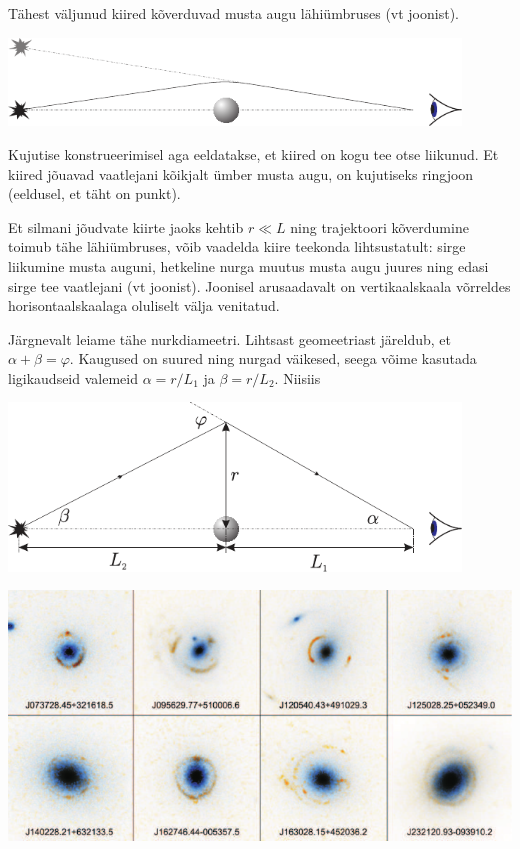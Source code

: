 \documentclass[11pt, twoside]{article}
\begin{document}
{{\ifSolution
Tähest väljunud kiired kõverduvad musta augu lähiümbruses (vt joonist). 

\begin{center}
	\includegraphics[width=0.9\textwidth]{2007-v2g-10-lah1}
\end{center}

Kujutise konstrueerimisel aga eeldatakse, et kiired on kogu tee otse liikunud. Et kiired jõuavad vaatlejani kõikjalt ümber musta augu, on kujutiseks ringjoon (eeldusel, et täht on punkt).

Et silmani jõudvate kiirte jaoks kehtib $r \ll L$ ning trajektoori kõverdumine toimub tähe lähiümbruses, võib vaadelda kiire teekonda lihtsustatult: sirge liikumine musta auguni, hetkeline nurga muutus musta augu juures ning edasi sirge tee vaatlejani (vt joonist). Joonisel arusaadavalt on vertikaalskaala võrreldes horisontaalskaalaga oluliselt välja venitatud.

Järgnevalt leiame tähe nurkdiameetri. Lihtsast geomeetriast järeldub, et $\alpha + \beta = \varphi$. Kaugused on suured ning nurgad väikesed, seega võime kasutada ligikaudseid valemeid $\alpha = r/L_1$ ja $\beta = r/L_2$. Niisiis

\begin{center}
	\includegraphics[width=0.9\textwidth]{2007-v2g-10-lah2}
\end{center}

\begin{center}
	\includegraphics[width=\textwidth]{2007-v2g-10-lah3}
\end{center}

}}
\end{document}
